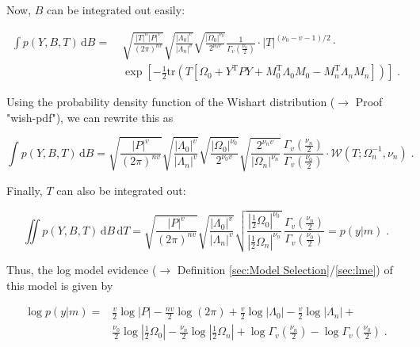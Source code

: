 \documentclass[a4paper,12pt,twoside]{book}
\begin{document}
Now, $B$ can be integrated out easily:

\begin{equation} \label{eq:mblr-lme-GLM-NW-LME-s3}
\begin{split}
\int p(Y,B,T) \, \mathrm{d}B = \; & \sqrt{\frac{|T|^n |P|^v}{(2 \pi)^{nv}}} \sqrt{\frac{|\Lambda_0|^v}{|\Lambda_n|^v}} \sqrt{\frac{|\Omega_0|^{\nu_0}}{2^{\nu_0 v}}} \frac{1}{\Gamma_v \left( \frac{\nu_0}{2} \right)} \cdot |T|^{(\nu_0-v-1)/2} \cdot \\
& \exp\left[ -\frac{1}{2} \mathrm{tr}\left( T \left[ \Omega_0 + Y^\mathrm{T} P Y + M_0^\mathrm{T} \Lambda_0 M_0 - M_n^\mathrm{T} \Lambda_n M_n \right] \right) \right] \; .
\end{split}
\end{equation}

Using the probability density function of the Wishart distribution ($\rightarrow$ Proof "wish-pdf"), we can rewrite this as

\begin{equation} \label{eq:mblr-lme-GLM-NW-LME-s4}
\int p(Y,B,T) \, \mathrm{d}B = \sqrt{\frac{|P|^v}{(2 \pi)^{nv}}} \sqrt{\frac{|\Lambda_0|^v}{|\Lambda_n|^v}} \sqrt{\frac{|\Omega_0|^{\nu_0}}{2^{\nu_0 v}}} \sqrt{\frac{2^{\nu_n v}}{|\Omega_n|^{\nu_n}}} \, \frac{\Gamma_v \left( \frac{\nu_n}{2} \right)}{\Gamma_v \left( \frac{\nu_0}{2} \right)} \cdot \mathcal{W}(T; \Omega_n^{-1}, \nu_n) \; .
\end{equation}

Finally, $T$ can also be integrated out:

\begin{equation} \label{eq:mblr-lme-GLM-NW-LME-s5}
\iint p(Y,B,T) \, \mathrm{d}B \, \mathrm{d}T = \sqrt{\frac{|P|^v}{(2 \pi)^{nv}}} \sqrt{\frac{|\Lambda_0|^v}{|\Lambda_n|^v}} \sqrt{\frac{\left| \frac{1}{2} \Omega_0 \right|^{\nu_0}}{\left| \frac{1}{2} \Omega_n \right|^{\nu_n}}} \, \frac{\Gamma_v \left( \frac{\nu_n}{2} \right)}{\Gamma_v \left( \frac{\nu_0}{2} \right)} = p(y|m) \; .
\end{equation}

Thus, the log model evidence ($\rightarrow$ Definition \ref{sec:Model Selection}/\ref{sec:lme}) of this model is given by

\begin{equation} \label{eq:mblr-lme-GLM-NW-LME-s6}
\begin{split}
\log p(y|m) = & \frac{v}{2} \log |P| - \frac{nv}{2} \log (2 \pi)  + \frac{v}{2} \log |\Lambda_0| - \frac{v}{2} \log |\Lambda_n| + \\
& \frac{\nu_0}{2} \log\left| \frac{1}{2} \Omega_0 \right| - \frac{\nu_n}{2} \log\left| \frac{1}{2} \Omega_n \right| + \log \Gamma_v \left( \frac{\nu_n}{2} \right) - \log \Gamma_v \left( \frac{\nu_0}{2} \right) \; .
\end{split}
\end{equation}
\end{document}
